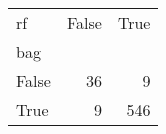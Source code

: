 \begin{tabular}{lrr}
\toprule
rf &  False &  True  \\
bag   &        &        \\
\midrule
False &     36 &      9 \\
True  &      9 &    546 \\
\bottomrule
\end{tabular}
